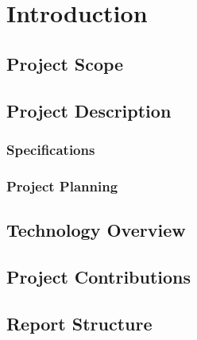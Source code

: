 \chapter{Introduction}

\section{Project Scope}

\section{Project Description}
\subsection{Specifications}
\subsection{Project Planning}

\section{Technology Overview}

\section{Project Contributions}

\section{Report Structure}